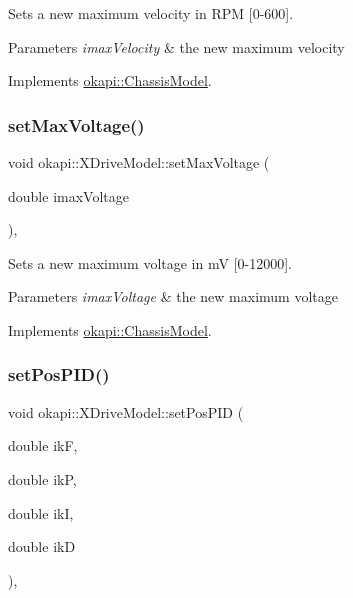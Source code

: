 Sets a new maximum velocity in R\+PM \mbox{[}0-\/600\mbox{]}.


\begin{DoxyParams}{Parameters}
{\em imax\+Velocity} & the new maximum velocity \\
\hline
\end{DoxyParams}


Implements \mbox{\hyperlink{classokapi_1_1ChassisModel_ae7fcb4cc95fdd7fd3c8f8388b4a698b2}{okapi\+::\+Chassis\+Model}}.

\mbox{\label{classokapi_1_1XDriveModel_a6d001a2147ecb642f60cd21ac73c64ea}} 
\subsubsection{\texorpdfstring{setMaxVoltage()}{setMaxVoltage()}}
{\footnotesize\ttfamily void okapi\+::\+X\+Drive\+Model\+::set\+Max\+Voltage (\begin{DoxyParamCaption}\item[{double}]{imax\+Voltage }\end{DoxyParamCaption})\hspace{0.3cm}{\ttfamily [override]}, {\ttfamily [virtual]}}

Sets a new maximum voltage in mV \mbox{[}0-\/12000\mbox{]}.


\begin{DoxyParams}{Parameters}
{\em imax\+Voltage} & the new maximum voltage \\
\hline
\end{DoxyParams}


Implements \mbox{\hyperlink{classokapi_1_1ChassisModel_a2fb261636b79e118f22530cc3fce4f41}{okapi\+::\+Chassis\+Model}}.

\mbox{\label{classokapi_1_1XDriveModel_ad3769e5e46350c07665563e7acad2ad4}} 
\subsubsection{\texorpdfstring{setPosPID()}{setPosPID()}}
{\footnotesize\ttfamily void okapi\+::\+X\+Drive\+Model\+::set\+Pos\+P\+ID (\begin{DoxyParamCaption}\item[{double}]{ikF,  }\item[{double}]{ikP,  }\item[{double}]{ikI,  }\item[{double}]{ikD }\end{DoxyParamCaption})\hspace{0.3cm}{\ttfamily [override]}, {\ttfamily [virtual]}}

